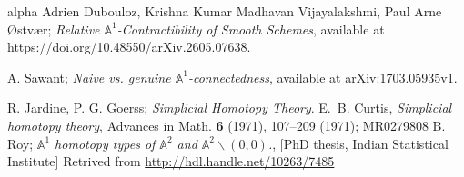 \documentclass[11pt, reqno]{amsart}
\theoremstyle{plain}
\theoremstyle{definition}
\newcommand{\A}{{\mathbb A}}
\begin{document}
\begin{thebibliography}{alpha}
 Adrien Dubouloz, Krishna Kumar Madhavan Vijayalakshmi, Paul Arne Østvær; \emph{Relative $\A^1$-Contractibility of Smooth Schemes}, available at https://doi.org/10.48550/arXiv.2605.07638.

 A. Sawant; \emph{Naive vs. genuine $\A^1$-connectedness}, available at  arXiv:1703.05935v1.

 R. Jardine, P. G. Goerss; \emph{Simplicial Homotopy Theory}.
 E.~B. Curtis, \emph{Simplicial homotopy theory}, Advances in Math. {\bf 6} (1971), 107--209 (1971); MR0279808
 B. Roy; \emph{$\A^1$ homotopy types of $\A^2$ and $\A^2\backslash(0,0)$.}, [PhD thesis, Indian Statistical Institute] Retrived from \url{http://hdl.handle.net/10263/7485}
		
		
		
		
		
		
		
		
		
		
		
		
		
		
		

\end{thebibliography}
\end{document}
